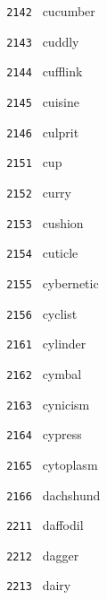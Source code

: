 \documentclass[11pt]{article}
\begin{document}
\begin{multicols}{6}
\noindent \texttt{ 2142 } \hspace{1mm} cucumber  \par
\noindent \texttt{ 2143 } \hspace{1mm} cuddly  \par
\noindent \texttt{ 2144 } \hspace{1mm} cufflink  \par
\noindent \texttt{ 2145 } \hspace{1mm} cuisine  \par
\noindent \texttt{ 2146 } \hspace{1mm} culprit  \par
\noindent \texttt{ 2151 } \hspace{1mm} cup  \par
\noindent \texttt{ 2152 } \hspace{1mm} curry  \par
\noindent \texttt{ 2153 } \hspace{1mm} cushion  \par
\noindent \texttt{ 2154 } \hspace{1mm} cuticle  \par
\noindent \texttt{ 2155 } \hspace{1mm} cybernetic  \par
\noindent \texttt{ 2156 } \hspace{1mm} cyclist  \par
\noindent \texttt{ 2161 } \hspace{1mm} cylinder  \par
\noindent \texttt{ 2162 } \hspace{1mm} cymbal  \par
\noindent \texttt{ 2163 } \hspace{1mm} cynicism  \par
\noindent \texttt{ 2164 } \hspace{1mm} cypress  \par
\noindent \texttt{ 2165 } \hspace{1mm} cytoplasm  \par
\noindent \texttt{ 2166 } \hspace{1mm} dachshund  \par
\noindent \texttt{ 2211 } \hspace{1mm} daffodil  \par
\noindent \texttt{ 2212 } \hspace{1mm} dagger  \par
\noindent \texttt{ 2213 } \hspace{1mm} dairy  \par

\end{multicols}
\end{document}
